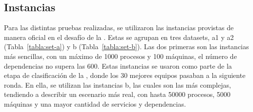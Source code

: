 \documentclass[../informe2.tex]{subfiles}
\begin{document}
\subsection{Instancias}
\label{sub:Instancias}
Para las distintas pruebas realizadas, se utilizaron las instancias provistas de manera oficial en el desafío de la \roadef. Estas se agrupan en tres datasets, a1 y a2 (Tabla~\ref{tabla:set-a}) y b (Tabla~\ref{tabla:set-b}). Las dos primeras son las instancias más sencillas, con un máximo de 1000 procesos y 100 máquinas, el número de dependencias no supera las 600. Estas instancias se usaron como parte de la etapa de clasificación de la \roadef, donde los 30 mejores equipos pasaban a la siguiente ronda. En ella, se utilizan las instancias b, las cuales son las más complejas, tendiendo a describir un escenario más real, con hasta 50000 procesos, 5000 máquinas y una mayor cantidad de servicios y dependencias.\\
\end{document}
